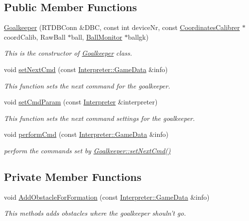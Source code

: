 \subsection*{Public Member Functions}
\begin{DoxyCompactItemize}
\item 
\hyperlink{classGoalkeeper_a7ad214162340c37a695ba00d4576c3c4}{Goalkeeper} (RTDBConn \&DBC, const int deviceNr, const \hyperlink{classCoordinatesCalibrer}{CoordinatesCalibrer} $\ast$coordCalib, RawBall $\ast$ball, \hyperlink{classBallMonitor}{BallMonitor} $\ast$ballgk)
\begin{DoxyCompactList}\small\item\em This is the constructor of \hyperlink{classGoalkeeper}{Goalkeeper} class. \item\end{DoxyCompactList}\item 
void \hyperlink{classGoalkeeper_abc394351f7c0d552c6e96da422c772ec}{setNextCmd} (const \hyperlink{structInterpreter_1_1GameData}{Interpreter::GameData} \&info)
\begin{DoxyCompactList}\small\item\em This function sets the next command for the goalkeeper. \item\end{DoxyCompactList}\item 
void \hyperlink{classGoalkeeper_acfa6fbad0f6b1627fd59cc7cce6ff321}{setCmdParam} (const \hyperlink{classInterpreter}{Interpreter} \&interpreter)
\begin{DoxyCompactList}\small\item\em This function sets the next command settings for the goalkeeper. \item\end{DoxyCompactList}\item 
void \hyperlink{classGoalkeeper_ab850d0d2278730bebc5479f1a339a925}{performCmd} (const \hyperlink{structInterpreter_1_1GameData}{Interpreter::GameData} \&info)
\begin{DoxyCompactList}\small\item\em perform the commands set by \hyperlink{classGoalkeeper_abc394351f7c0d552c6e96da422c772ec}{Goalkeeper::setNextCmd()} \item\end{DoxyCompactList}\end{DoxyCompactItemize}
\subsection*{Private Member Functions}
\begin{DoxyCompactItemize}
\item 
void \hyperlink{classGoalkeeper_a5287a2e74795bbec8f0ead767655da5d}{AddObstacleForFormation} (const \hyperlink{structInterpreter_1_1GameData}{Interpreter::GameData} \&info)
\begin{DoxyCompactList}\small\item\em This methods adds obstacles where the goalkeeper shouln't go. \item\end{DoxyCompactList}\end{DoxyCompactItemize}
